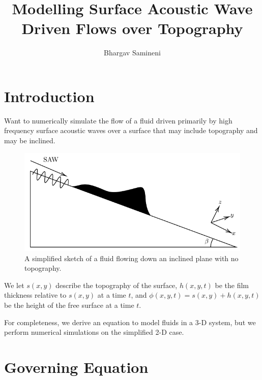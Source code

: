 \documentclass[compress, xcolor=dvipsnames]{beamer}
\title{Modelling Surface Acoustic Wave Driven Flows over Topography}
\author{Bhargav Samineni}
\newcommand{\func}[2]{\ensuremath{#1\!\lrp{#2}}}
\newcommand{\lrp}[1]{\left( #1 \right)}
\begin{document}
   
    \frame{\titlepage}    

    \section{Introduction}
    \begin{frame}
        Want to numerically simulate the flow of a fluid driven primarily by 
        high frequency surface acoustic waves over a surface that may include topography
        and may be inclined. 

        \begin{figure}[hb]
            \centering
            \includegraphics[width=.75\textwidth]{images/samp_diagram.pdf}
            \caption{A simplified sketch of a fluid flowing down an inclined plane with no topography.}
            \label{fig:model_diagram}
        \end{figure}
    \end{frame}
    \begin{frame}
        We let $\func{s}{x, y}$ describe the topography of the surface, 
        $\func{h}{x,y,t}$ be the film thickness relative to $\func{s}{x,y}$ at a time $t$, 
        and $\func{\phi}{x,y,t} = \func{s}{x,y} + \func{h}{x,y,t}$ be the height of the free surface at a time $t$.

        For completeness, we derive an equation to model fluids in a 
        3-D system, but we perform numerical simulations on the simplified 2-D case. 
    \end{frame}

    \section{Governing Equation}
\end{document}
